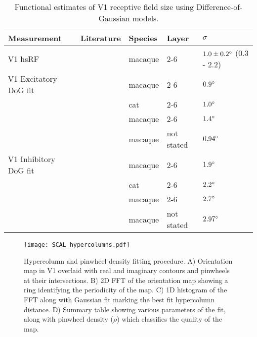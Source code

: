 \begin{table}
  \centering
  \begin{adjustbox}{width=1\textwidth}
  \begin{tabular}{l | l l l l}
    Measurement              & Literature            & Species & Layer & $\sigma$ \\
    \hline
    V1 hsRF                  & \cite{Levitt2002}     & macaque & 2-6 & $1.0 \pm 0.2 \degree$ (0.3 - 2.2) \\
    \hline
    V1 Excitatory DoG fit    & \cite{Levitt2002}     & macaque & 2-6 & $0.9 \degree$ \\
                             & \cite{Sceniak2001}    & cat     & 2-6 & $1.0 \degree$ \\
                             & \cite{Cavanaugh2002}  & macaque & 2-6 & $1.4 \degree$ \\
                             & \cite{Solomon2002}    & macaque & not stated & $0.94 \degree$ \\
    \hline
    V1 Inhibitory DoG fit    & \cite{Levitt2002}     & macaque & 2-6 & $1.9 \degree$ \\
                             & \cite{Sceniak2001}    & cat     & 2-6 & $2.2 \degree$ \\
                             & \cite{Cavanaugh2002}  & macaque & 2-6 & $2.7 \degree$ \\
                             & \cite{Solomon2002}    & macaque & not stated & $2.97 \degree$ \\
    \hline
  \end{tabular}
  \end{adjustbox}
  \caption[]%
          {Functional estimates of V1 receptive field size using Difference-of-Gaussian models.}
  \label{electrophystable}
\end{table}

\begin{figure}
	\centering
        \texttt{[image: SCAL\_hypercolumns.pdf]}
	\caption{Hypercolumn and pinwheel density fitting
          procedure. A) Orientation map in V1 overlaid with real and
          imaginary contours and pinwheels at their intersections. B)
          2D FFT of the orientation map showing a ring identifying the
          periodicity of the map. C) 1D histogram of the FFT along
          with Gaussian fit marking the best fit hypercolumn distance.
          D) Summary table showing various parameters of the fit,
          along with pinwheel density ($\rho$) which classifies the
          quality of the map.}
	\label{SCALhypercolumns}
\end{figure}

